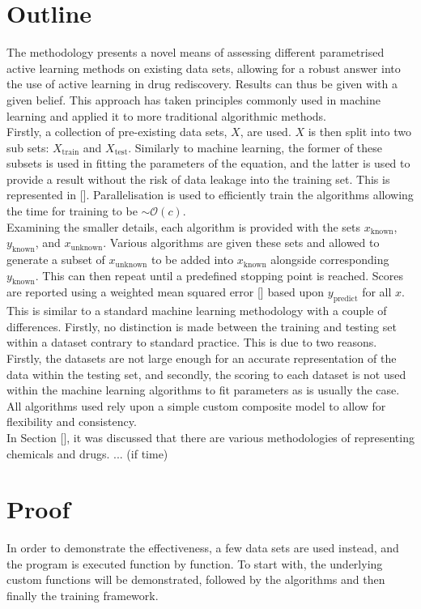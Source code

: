 \section{Outline}
The methodology presents a novel means of assessing different parametrised active learning methods on existing data sets, allowing for a robust answer into the use of active learning in drug rediscovery. Results can thus be given with a given belief. This approach has taken principles commonly used in machine learning and applied it to more traditional algorithmic methods.
\\
Firstly, a collection of pre-existing data sets, $X$, are used. $X$ is then split into two sub sets: $X_{\mathrm{train}}$ and $X_\mathrm{test}$. Similarly to machine learning, the former of these subsets is used in fitting the parameters of the equation, and the latter is used to provide a result without the risk of data leakage into the training set. This is represented in []. Parallelisation is used to efficiently train the algorithms allowing the time for training to be $\sim{}\mathcal{O}(c)$.
\\
Examining the smaller details, each algorithm is provided with the sets $x_\mathrm{known}$, $y_\mathrm{known}$, and $x_\mathrm{unknown}$. Various algorithms are given these sets and allowed to generate a subset of $x_\mathrm{unknown}$ to be added into $x_\mathrm{known}$ alongside corresponding $y_\mathrm{known}$. This can then repeat until a predefined stopping point is reached. Scores are reported using a weighted mean squared error [] based upon $y_\mathrm{predict}$ for all $x$. This is similar to a standard machine learning methodology with a couple of differences. Firstly, no distinction is made between the training and testing set within a dataset contrary to standard practice. This is due to two reasons. Firstly, the datasets are not large enough for an accurate representation of the data within the testing set, and secondly, the scoring to each dataset is not used within the machine learning algorithms to fit parameters as is usually the case. All algorithms used rely upon a simple custom composite model to allow for flexibility and consistency.
\\
In Section [], it was discussed that there are various methodologies of representing chemicals and drugs. ... (if time)
\section{Proof}
In order to demonstrate the effectiveness, a few data sets are used instead, and the program is executed function by function. To start with, the underlying custom functions will be demonstrated, followed by the algorithms and then finally the training framework.

